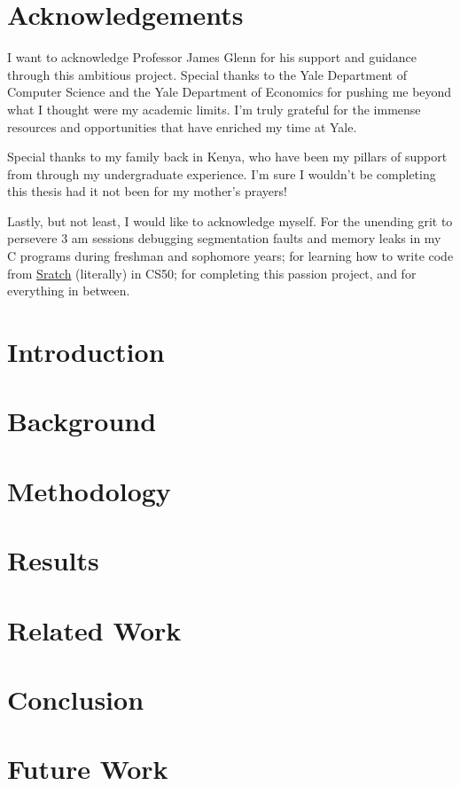 \documentclass[12pt,twoside]{report}
\begin{document}


\chapter*{Acknowledgements}
I want to acknowledge Professor James Glenn for his support and guidance through this ambitious project. Special thanks to the Yale Department of Computer Science and the Yale Department of Economics for pushing me beyond what I thought were my academic limits. I'm truly grateful for the immense resources and opportunities that have enriched my time at Yale.

Special thanks to my family back in Kenya, who have been my pillars of support from through my undergraduate experience. I'm sure I wouldn't be completing this thesis had it not been for my mother's prayers! 

Lastly, but not least, I would like to acknowledge myself. For the unending grit to persevere 3 am sessions debugging segmentation faults and memory leaks in my C programs during freshman and sophomore years; for learning how to write code from \href{https://scratch.mit.edu/}{Sratch} (literally) in CS50; for completing this passion project,
and for everything in between.
{
  \hypersetup{linkcolor=black}
  \tableofcontents
}

\clearpage




\chapter{Introduction}


\chapter{Background} \label{ch:background}


\chapter{Methodology} \label{ch:methodology}



\chapter{Results} \label{ch:results}


\chapter{Related Work} \label{ch:relatedwork}


\chapter{Conclusion} \label{ch:conclusion}


\chapter{Future Work} \label{ch:futurework}



\printbibliography
\end{document}
